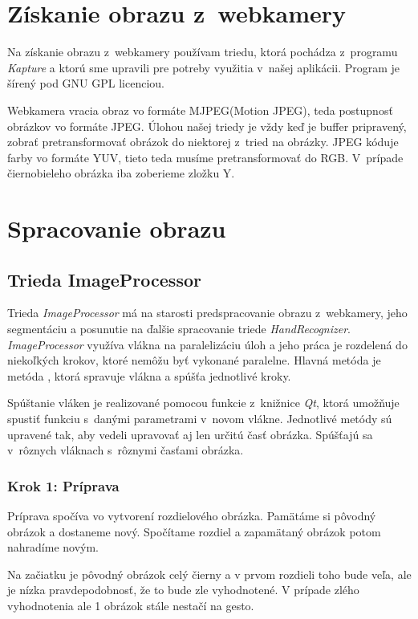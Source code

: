 \section{Získanie obrazu z~webkamery}
Na získanie obrazu z~webkamery používam triedu, ktorá pochádza z~programu \textit{Kapture} \cite{kapture} a ktorú sme upravili pre potreby využitia v~našej aplikácii. Program je šírený pod GNU GPL licenciou.

Webkamera vracia obraz vo formáte MJPEG(Motion JPEG), teda postupnosť obrázkov vo formáte JPEG. Úlohou našej triedy je vždy keď je buffer pripravený, zobrať pretransformovať obrázok do niektorej z~tried na obrázky. JPEG kóduje farby vo formáte YUV, tieto teda musíme pretransformovať do RGB. V~prípade čiernobieleho obrázka iba zoberieme zložku Y.

\section{Spracovanie obrazu}
\label{chap:imageprocess}
\subsection{Trieda ImageProcessor}
Trieda \textit{ImageProcessor} má na starosti predspracovanie obrazu z~webkamery, jeho segmentáciu a posunutie na ďalšie spracovanie triede \textit{HandRecognizer}. \textit{ImageProcessor} využíva vlákna na paralelizáciu úloh a jeho práca je rozdelená do niekoľkých krokov, ktoré nemôžu byť vykonané paralelne. Hlavná metóda je metóda , ktorá spravuje vlákna a spúšťa jednotlivé kroky. 

Spúštanie vláken je realizované pomocou funkcie  z~knižnice \textit{Qt}, ktorá umožňuje spustiť funkciu s~danými parametrami v~novom vlákne. Jednotlivé metódy sú upravené tak, aby vedeli upravovať aj len určitú časť obrázka. Spúšťajú sa v~rôznych vláknach s~rôznymi časťami obrázka. %

\subsubsection{Krok 1: Príprava}
Príprava spočíva vo vytvorení rozdielového obrázka. Pamätáme si pôvodný obrázok a dostaneme nový. Spočítame rozdiel a zapamätaný obrázok potom nahradíme novým.

Na začiatku je pôvodný obrázok celý čierny a v prvom rozdieli toho bude veľa, ale je nízka pravdepodobnosť, že to bude zle vyhodnotené. V prípade zlého vyhodnotenia ale 1 obrázok stále nestačí na gesto.

